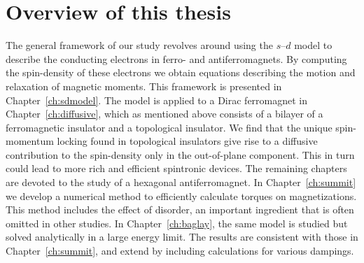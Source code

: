 \section{Overview of this thesis}
The general framework of our study revolves around using the $s$--$d$ model to describe the conducting electrons in ferro- and antiferromagnets. By computing the spin-density of these electrons we obtain equations describing the motion and relaxation of magnetic moments. This framework is presented in Chapter~\ref{ch:sdmodel}. The model is applied to a Dirac ferromagnet in Chapter~\ref{ch:diffusive}, which as mentioned above consists of a bilayer of a ferromagnetic insulator and a topological insulator. We find that the unique spin-momentum locking found in topological insulators give rise to a diffusive contribution to the spin-density only in the out-of-plane component. This in turn could lead to more rich and efficient spintronic devices. The remaining chapters are devoted to the study of a hexagonal antiferromagnet. In Chapter~\ref{ch:summit} we develop a numerical method to efficiently calculate torques on magnetizations. This method includes the effect of disorder, an important ingredient that is often omitted in other studies. In Chapter~\ref{ch:baglay}, the same model is studied but solved analytically in a large energy limit. The results are consistent with those in Chapter~\ref{ch:summit}, and extend by including calculations for various dampings. 







